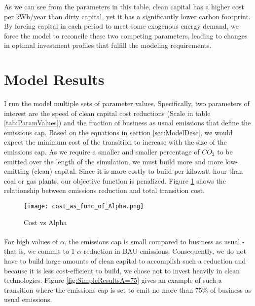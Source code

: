 \documentclass{easychithesis}
\begin{document}
As we can see from the parameters in this table, clean capital has a higher cost per kWh/year than dirty capital, yet it has a significantly lower carbon footprint. By forcing capital in each period to meet some exogenous energy demand, we force the model to reconcile these two competing parameters, leading to changes in optimal investment profiles that fulfill the modeling requirements.



\section{Model Results}
\FloatBarrier

\paragraph{} I run the model multiple sets of parameter values. Specifically, two parameters of interest are the speed of clean capital cost reductions (Scale in table \ref{tab:ParamValues}) and the fraction of business as usual emissions that define the emissions cap. Based on the equations in section \ref{sec:ModelDesc}, we would expect the minimum cost of the transition to increase with the size of the emissions cap. As we require a smaller and smaller percentage of $CO_2$ to be emitted over the length of the simulation, we must build more and more low-emitting (clean) capital. Since it is more costly to build per kilowatt-hour than coal or gas plants, our objective function is penalized. Figure \ref{fig:costVsAlpha} shows the relationship between emissions reduction and total transition cost. 

\begin{figure}[h]
\texttt{[image: cost\_as\_func\_of\_Alpha.png]}
\caption{Cost vs Alpha\label{fig:costVsAlpha}}
\end{figure}


\FloatBarrier

\paragraph{} For high values of $\alpha$, the emissions cap is small compared to business as usual - that is, we commit to 1-$\alpha$ reduction in BAU emissions. Consequently, we do not have to build large amounts of clean capital to accomplish such a reduction and because it is less cost-efficient to build, we chose not to invest heavily in clean technologies. Figure \ref{fig:SimpleResultsA=75} gives an example of such a transition where the emissions cap is set to emit no more than 75\% of business as usual emissions. 
\end{document}
